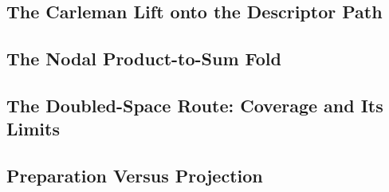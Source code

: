 %

\subsection{The Carleman Lift onto the Descriptor Path}

\subsection{The Nodal Product-to-Sum Fold}

\subsection{The Doubled-Space Route: Coverage and Its Limits}

\subsection{Preparation Versus Projection}
